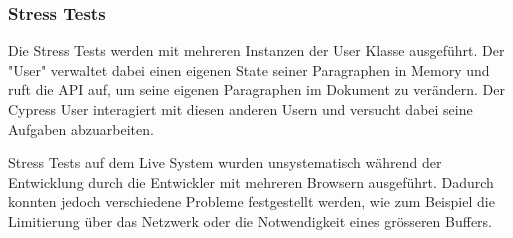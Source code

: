 \subsubsection{Stress Tests}
Die Stress Tests werden mit mehreren Instanzen der User Klasse ausgef\"uhrt.
Der "User" verwaltet dabei einen eigenen State seiner Paragraphen in Memory und ruft die API auf, um seine eigenen Paragraphen im Dokument zu ver\"andern.
Der Cypress User interagiert mit diesen anderen Usern und versucht dabei seine Aufgaben abzuarbeiten.

Stress Tests auf dem Live System wurden unsystematisch w\"ahrend der Entwicklung durch die Entwickler mit mehreren Browsern ausgef\"uhrt.
Dadurch konnten jedoch verschiedene Probleme festgestellt werden, wie zum Beispiel die Limitierung \"uber das Netzwerk oder die Notwendigkeit eines gr\"osseren Buffers.